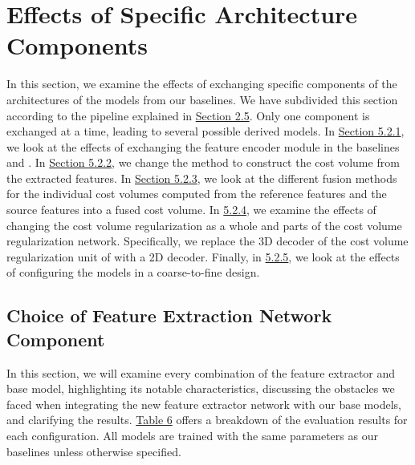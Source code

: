 \section{Effects of Specific Architecture Components}\label{sec:exp-arch}
In this section, we examine the effects of exchanging specific components of the architectures of the {\mvs} models from our baselines. We have subdivided this section according to the {\mvs} pipeline explained in \hyperref[sec:mvspipeline]{Section 2.5}. Only one component is exchanged at a time, leading to several possible derived models.  
In \hyperref[subsec:fe]{Section 5.2.1}, we look at the effects of exchanging the feature encoder module in the baselines {\mvs} and {\rmvd}. In \hyperref[subsec:cvc]{Section 5.2.2}, we change the method to construct the cost volume from the extracted features. In \hyperref[subsec:cvf]{Section 5.2.3}, we look at the different fusion methods for the individual cost volumes computed from the reference features and the source features into a fused cost volume. In \hyperref[subsec:cvr]{5.2.4}, we examine the effects of changing the cost volume regularization as a whole and parts of the cost volume regularization network. Specifically, we replace the 3D decoder of the cost volume regularization unit of {\mvsn} with a 2D decoder. Finally, in \hyperref[subsec:c2f]{5.2.5}, we look at the effects of configuring the models in a coarse-to-fine design. 
\subsection{Choice of Feature Extraction Network Component}\label{subsec:fe}
In this section, we will examine every combination of the feature extractor and base model, highlighting its notable characteristics, discussing the obstacles we faced when integrating the new feature extractor network with our base models, and clarifying the results. \hyperref[tab:feat-enc]{Table 6} offers a breakdown of the evaluation results for each configuration. All models are trained with the same parameters as our baselines unless otherwise specified. 




